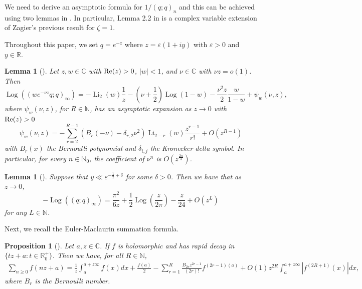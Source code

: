 \documentclass[11pt,reqno]{amsart}
\newtheorem{lemma}[theorem]{Lemma}
\newtheorem{proposition}[theorem]{Proposition}
\theoremstyle{remark}
\numberwithin{equation}{section}
\def\Log{\operatorname{Log}}
\def\Li{\operatorname{Li}}
\renewcommand{\Re}{{\rm Re}}
\renewcommand{\Re}{{\rm Re}}
\def\Log{\operatorname{Log}}
\def\Li{\operatorname{Li}}
\begin{document}
We need to derive an asymptotic formula for $1/(q;q)_n$ and this can be achieved using two lemmas %
in \cite[Lemmas 2.1, 2.2]{BMRS}. In particular, Lemma 2.2 in \cite{BMRS} is a complex variable extension of Zagier's previous result \cite[Lemma 2.1]{GZ} for $\zeta=1$. 

Throughout this paper, we set $q=e^{-z}$ where $z = \varepsilon (1+iy)$ with $\varepsilon >0$ and $y \in \mathbb{R}$.

\begin{lemma}[{\cite[Lemma 2.2]{BMRS}}]\label{lem:Zagier_asym}
	Let $z, w \in \mathbb{C}$ with ${\rm Re}(z) >0$, $|w|<1$, and $\nu \in \mathbb{C}$ with $\nu z = o(1)$. Then
	\[
		\Log \left( (we^{-\nu z} q;q)_\infty \right) = - \Li_2 (w) \frac{1}{z} - \left( \nu + \frac{1}{2} \right) \Log(1-w) - \frac{\nu^2 z}{2} \frac{w}{1-w} + \psi_w(\nu, z),
	\]
	where $\psi_w (\nu, z)$, for $R \in \mathbb{N}$, has an asymptotic expansion as $z\to 0$ with $\Re(z)>0$
	\begin{equation}\label{eq:psi}
		\psi_w(\nu, z) = -\sum_{r=2}^{R-1} \left( B_r(-\nu)-\delta_{r,2} \nu^2 \right) \Li_{2-r}(w) \frac{z^{r-1}}{r!} + O\left( z^{R-1} \right)
	\end{equation}
	with $B_r(x)$ the Bernoulli polynomial and $\delta_{i,j}$ the Kronecker delta symbol. In particular, for every $n \in \mathbb{N}_0$, the coefficient of $\nu^n$ is $O\left(z^{\frac{2n}{3}} \right)$.
\end{lemma}



\begin{lemma}[{\cite[Lemma 2.1]{BMRS}}]\label{lem:eta_asym}
Suppose that $y \ll \varepsilon^{-\frac{1}{2} + \delta}$ for some $\delta>0$. Then we have that as $z \to 0$, 
\[
	- \Log \left( (q;q)_\infty \right) = \frac{\pi^{2}}{6z} + \frac{1}{2} \Log\left( \frac{z}{2\pi} \right) - \frac{z}{24} + O(z^L)
\]
for any $L \in \mathbb{N}$. 
\end{lemma}


Next, we recall the Euler-Maclaurin summation formula.
\begin{proposition}[{\cite[Proposition 2.3]{BMRS}}]\label{EM}
	Let $a, z \in \mathbb{C}$. If $f$ is holomorphic and has rapid decay in $\{tz+a: t \in \mathbb{R}_0^{+}\}$. Then we have, for all $R \in \mathbb{N}$,
	\begin{align*}
		\sum_{n \geq 0} f(nz+a) = \frac{1}{z} \int_{a}^{a+z\infty} f(x) dx + \frac{f(a)}{2} - \sum_{r=1}^R \frac{B_{2r} z^{2r-1}}{(2r)!} f^{(2r-1)(a)} + O(1)z^{2R} \int_{a}^{a+z\infty} \left| f^{(2R+1)}(x)\right| dx,
	\end{align*}
    where $B_r$ is the Bernoulli number.
\end{proposition}
\end{document}

